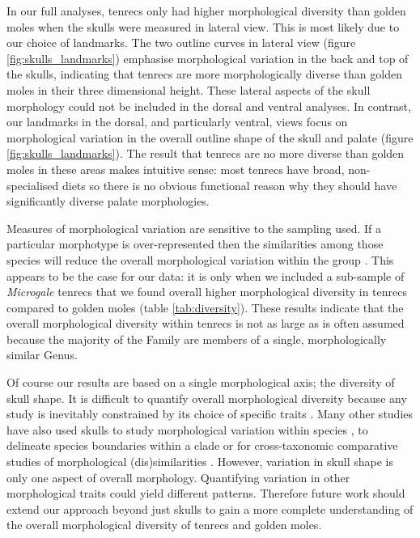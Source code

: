 \documentclass[12pt,a4paper]{article}
\begin{document}
	
	In our full analyses, tenrecs only had higher morphological diversity than golden moles when the skulls were measured in lateral view. This is most likely due to our choice of landmarks. The two outline curves in lateral view (figure \ref{fig:skulls_landmarks}) emphasise morphological variation in the back and top of the skulls, indicating that tenrecs are more morphologically diverse than golden moles in their three dimensional height. 
	These lateral aspects of the skull morphology could not be included in the dorsal and ventral analyses. In contrast, our landmarks in the dorsal, and particularly ventral, views focus on morphological variation in the overall outline shape of the skull and palate (figure \ref{fig:skulls_landmarks}). The result that tenrecs are no more diverse than golden moles in these areas makes intuitive sense: most tenrecs have broad, non-specialised diets \citep{Olson2013} so there is no obvious functional reason why they should have significantly diverse palate morphologies.
	
	
	
	Measures of morphological variation are sensitive to the sampling used. If a particular morphotype is over-represented then the similarities among those species will reduce the overall morphological variation within the group \citep{Foote1991}. This appears to be the case for our data: it is only when we included a sub-sample of \textit{Microgale} tenrecs that we found overall higher morphological diversity in tenrecs compared to golden moles (table \ref{tab:diversity}). These results indicate that the overall morphological diversity within tenrecs is not as large as is often assumed \citep[e.g.][]{Eisenberg1969, Olson2013} because the majority of the Family are members of a single, morphologically similar Genus.


	Of course our results are based on a single morphological axis; the diversity of skull shape. It is difficult to quantify overall morphological diversity because any study is inevitably constrained by its choice of specific traits \citep{Roy1997}. Many other studies have also used skulls to study morphological variation within species \citep{Blagojevic2011, Bornholdt2008}, to delineate species boundaries within a clade \citep[e.g.][]{Panchetti2008} or for cross-taxonomic comparative studies of morphological (dis)similarities \citep[e.g.][]{Ruta2013, Goswami2011, Wroe2007}. 
	However, variation in skull shape is only one aspect of overall morphology. Quantifying variation in other morphological traits could yield different patterns. Therefore future work should extend our approach beyond just skulls to gain a more complete understanding of the overall morphological diversity of tenrecs and golden moles. 
		
\end{document}
